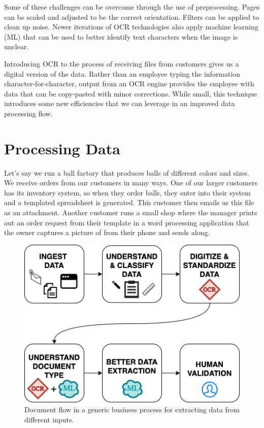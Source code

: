 \documentclass[conference]{IEEEtran}
\begin{document}
Some of these challenges can be overcome through the use of preprocessing. Pages can be scaled and adjusted to be the correct orientation. Filters can be applied to clean up noise. Newer iterations of OCR technologies also apply machine learning (ML) that can be used to better identify text characters when the image is unclear.

Introducing OCR to the process of receiving files from customers gives us a digital version of the data. Rather than an employee typing the information character-for-character, output from an OCR engine provides the employee with data that can be copy-pasted with minor corrections. While small, this technique introduces some new efficiencies that we can leverage in an improved data processing flow.

\section{Processing Data} \label{sectionProcessingData}

Let's say we run a ball factory that produces balls of different colors and sizes. We receive orders from our customers in many ways. One of our larger customers has its inventory system, so when they order balls, they enter into their system and a templated spreadsheet is generated. This customer then emails us this file as an attachment. Another customer runs a small shop where the manager prints out an order request from their template in a word processing application that the owner captures a picture of from their phone and sends along.

\begin{figure}[ht]
\centerline{\includegraphics[width=\columnwidth]{HighLevelFlow.png}}
\caption{Document flow in a generic business process for extracting data from different inputs.}
\label{figHighLevelFlow}
\end{figure}
\end{document}
